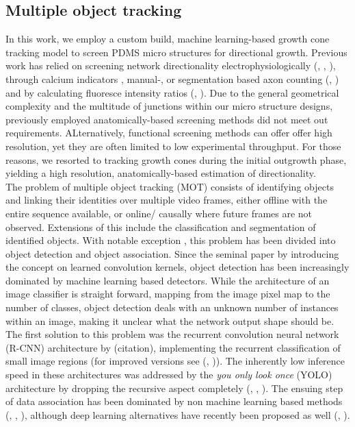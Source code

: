 \subsection{Multiple object tracking}
In this work, we employ a custom build, machine learning-based growth cone
tracking model to screen PDMS micro structures for directional growth. Previous
work has relied on screening network directionality electrophysiologically
(\cite{forro}, \cite{isomura}, \cite{lefeber}), through calcium indicators
\parencite{na}, manual-, or segmentation based axon counting (\cite{pirlo},
\cite{forro}) and by calculating fluoresce intensity ratios (\cite{renault},
\cite{na}). Due to the general geometrical complexity and the multitude of
junctions within our micro structure designs, previously employed
anatomically-based screening methods did not meet out requirements.
ALternatively, functional screening methods can offer offer high resolution, yet
they are often limited to low experimental throughput. For those reasons, we
resorted to tracking growth cones during the initial outgrowth phase, yielding a
high resolution, anatomically-based estimation of directionality. \\

The problem of multiple object tracking (MOT) consists of identifying objects
and linking their identities over multiple video frames, either offline with the
entire sequence available, or online/ causally where future frames are not
observed. Extensions of this include the classification and segmentation of
identified objects. With notable exception \cite{graphmot}, this problem has
been divided into object detection and object association. Since the seminal
paper by \cite{alexnet} introducing the concept on learned convolution kernels,
object detection has been increasingly dominated by machine learning based
detectors. While the architecture of an image classifier is straight forward,
mapping from the image pixel map to the number of classes, object detection
deals with an unknown number of instances within an image, making it unclear
what the network output shape should be. The first solution to this problem was
the recurrent convolution neural network (R-CNN) architecture by (citation),
implementing the recurrent classification of small image regions (for improved
versions see (\cite{fastrcnn}, \cite{fasterrcnn})). The inherently low inference
speed in these architectures was addressed by the \textit{you only look once}
(YOLO) architecture by dropping the recursive aspect completely (\cite{yolo},
\cite{yolo3}, \cite{yolo5}). The ensuing step of data association has been
dominated by non machine learning based methods (\cite{sort}, \cite{hungarian},
\cite{MCF}), although deep learning alternatives have recently been proposed as
well (\cite{deepsort}, \cite{assreview}). \\


